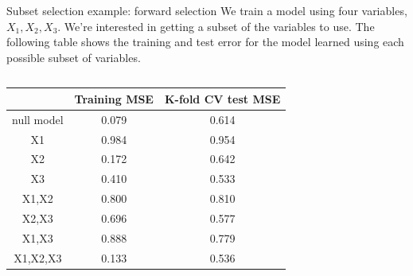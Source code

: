 \documentclass[aspectratio=169,usenames,dvipsnames]{beamer}
\begin{document}
\begin{frame}[t]{Subset selection example: forward selection}
	We train a model using four variables, $X_1,X_2,X_3$.
	We're interested in getting a subset of the variables to use. The following table shows the training and test error for the model learned using each possible subset of variables.
	\begin{columns}
	\centering
	\begin{center}
	\begin{tabular}{c | c | c}
			& Training MSE & K-fold CV test MSE\\
		\hline
		null model & 0.079 &	0.614\\
		\hline
		X1 &0.984	&0.954 \\
		\hline
		X2&0.172	&0.642\\
		\hline
		X3&0.410	&0.533\\
		\hline
		X1,X2&0.800	&0.810\\
		\hline
		X2,X3&0.696	&0.577\\
		\hline
		X1,X3&0.888	&0.779\\
		\hline
		X1,X2,X3&0.133	&0.536\\
		\hline
	\end{tabular}
	\end{center}
	
	\centering

	
	\end{columns}
	\end{frame}
\end{document}
